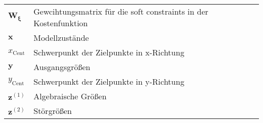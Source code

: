 \begin{longtable}{p{}p{}}
    $\boldsymbol{W_{\xi}}$           & Gewcihtungsmatrix für die soft constraints in der Kostenfunktion \\
    $\boldsymbol{x}$                 & Modellzustände                                                   \\
    $x_{\mathrm{Cent}}$              & Schwerpunkt der Zielpunkte in x-Richtung                         \\
    $\boldsymbol{y}$                 & Ausgangsgrößen                                                   \\
    $y_{\mathrm{Cent}}$              & Schwerpunkt der Zielpunkte in y-Richtung                         \\
    $\boldsymbol{z}^{(1)}$           & Algebraische Größen                                              \\
    $\boldsymbol{z}^{(2)}$           & Störgrößen                                                       \\
\end{longtable}

\clearpage
\newpage \vspace*{-1cm}

\renewcommand{\arraystretch}{1.5}
